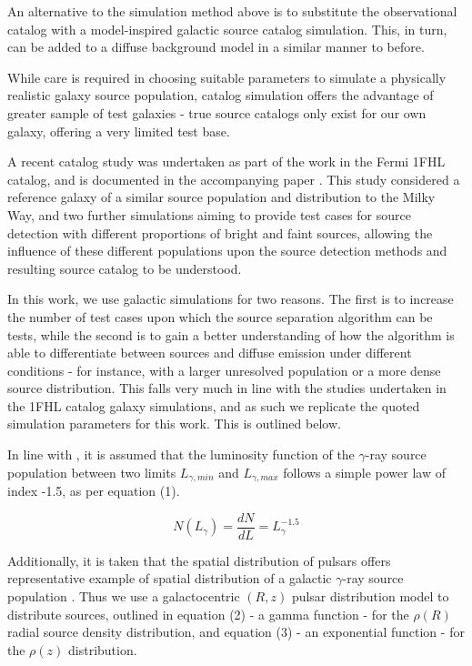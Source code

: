 \documentclass{PoS}
\begin{document}
An alternative to the simulation method above is to substitute the observational catalog with a model-inspired galactic source catalog simulation. This, in turn, can be added to a diffuse background model in a similar manner to before.

While care is required in choosing suitable parameters to simulate a physically realistic galaxy source population, catalog simulation offers the advantage of greater sample of test galaxies - true source catalogs only exist for our own galaxy, offering a very limited test base.

A recent catalog study was undertaken as part of the work in the Fermi 1FHL catalog, and is documented in the accompanying paper \cite{1fhl}. This study considered a reference galaxy of a similar source population and distribution to the Milky Way, and two further simulations aiming to provide test cases for source detection with different proportions of bright and faint sources, allowing the influence of these different populations upon the source detection methods and resulting source catalog to be understood. 

In this work, we use galactic simulations for two reasons. The first is to increase the number of test cases upon which the source separation algorithm can be tests, while the second is to gain a better understanding of how the algorithm is able to differentiate between sources and diffuse emission under different conditions - for instance, with a larger unresolved population or a more dense source distribution. This falls very much in line with the studies undertaken in the 1FHL catalog galaxy simulations, and as such we replicate the quoted simulation parameters \cite[p.59]{1fhl} for this work. This is outlined below.

In line with \cite{Strong}, it is assumed that the luminosity function of the $\gamma$-ray source population between two limits $L_{\gamma, min}$ and $L_{\gamma, max}$ follows a simple power law of index -1.5, as per equation (1).

\begin{equation}
N(L_{\gamma}) = \frac{dN}{dL} = L_{\gamma}^{-1.5}
\end{equation}

Additionally, it is taken that the spatial distribution of pulsars offers representative example of spatial distribution of a galactic $\gamma$-ray source population \cite[p.2]{Strong}. Thus we use a galactocentric $(R, z)$ pulsar distribution model \cite[p.7]{Lorimer} to distribute sources, outlined in equation (2) - a gamma function - for the $\rho(R)$ radial source density distribution, and equation (3) - an exponential function - for the $\rho(z)$ distribution.
\end{document}
